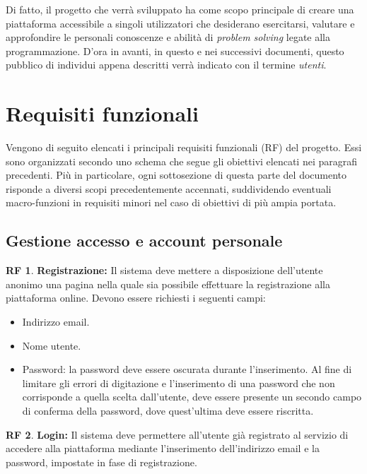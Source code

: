 \documentclass[11pt, a4paper]{article}
\theoremstyle{definition}
\newtheorem{funcreq}{RF} %
\begin{document}
Di fatto, il progetto che verrà sviluppato ha come scopo principale di
creare una piattaforma accessibile a singoli utilizzatori che desiderano
esercitarsi, valutare e approfondire le personali conoscenze e abilità di
\textit{problem solving} legate alla programmazione.
D'ora in avanti, in questo e nei successivi documenti, questo pubblico di
individui appena descritti verrà indicato con il termine \textit{utenti}.

\newpage
\section{Requisiti funzionali}
Vengono di seguito elencati i principali requisiti funzionali (RF)
del progetto. Essi sono organizzati secondo uno schema che segue gli
obiettivi elencati nei paragrafi precedenti. Più in particolare,
ogni sottosezione di questa parte del documento risponde a diversi
scopi precedentemente accennati, suddividendo eventuali macro-funzioni
in requisiti minori nel caso di obiettivi di più ampia portata.

\subsection{Gestione accesso e account personale}

\begin{funcreq}
\textbf{Registrazione:}
Il sistema deve mettere a disposizione dell'utente anonimo una pagina
nella quale sia possibile effettuare la registrazione alla piattaforma
online. Devono essere richiesti i seguenti campi:
\begin{itemize}
    \item Indirizzo email.
    \item Nome utente.
    \item Password: la password deve essere oscurata durante l'inserimento.
    Al fine di limitare gli errori di digitazione e l'inserimento di una
    password che non corrisponde a quella scelta dall'utente, deve essere
    presente un secondo campo di conferma della password, dove quest'ultima
    deve essere riscritta.
\end{itemize}
\end{funcreq}

\begin{funcreq}
\textbf{Login:}
Il sistema deve permettere all'utente già registrato al servizio di
accedere alla piattaforma mediante l'inserimento dell'indirizzo
email e la password, impostate in fase di registrazione.
\end{funcreq}
\end{document}
